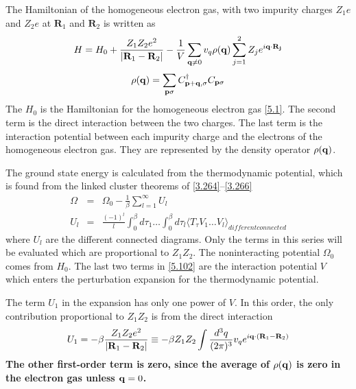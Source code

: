 The Hamiltonian of the homogeneous electron gas, with two impurity charges $Z_1 e$ and $Z_2 e$ at $\mathbf{R}_1$ and $\mathbf{R}_2$ is written as
\begin{equation}
    H= H_0 + \frac{Z_1 Z_2 e^2}{\abs{\mathbf{R}_1 - \mathbf{R}_2}} - \frac{1}{V} \sum_{\mathbf{q}\neq 0} v_q \rho(\mathbf{q}) \sum_{j=1}^2 Z_j e^{i\mathbf{q} \cdot \mathbf{R_j}}      \label{5.102}
\end{equation}
\begin{equation}
    \rho(\mathbf{q}) = \sum_{\mathbf{p}\sigma} C^\dagger_{\mathbf{p}+\mathbf{q},\sigma} C_{\mathbf{p}\sigma}   \label{5.103}
\end{equation}
The $H_0$ is the Hamiltonian for the homogeneous electron gas \eqref{5.1}.
The second term is the direct interaction between the two charges.
The last term is the interaction potential between each impurity charge and the electrons of the homogeneous electron gas.
They are represented by the density operator $\rho(\mathbf{q})$.

The ground state energy is calculated from the thermodynamic potential, which is found from the linked cluster theorems of \eqref{3.264}--\eqref{3.266}
\begin{eqnarray}
    \Omega &=& \Omega_0 - \frac{1}{\beta} \sum_{l=1}^\infty U_l \nonumber \\
    U_l &=& \frac{(-1)^l}{l} \int_0^\beta d\tau_1 \dots \int_0^\beta d \tau_l \langle T_\tau V_1 \dots V_l \rangle_{different connected} \nonumber
\end{eqnarray}
where $U_l$ are the different connected diagrams.
Only the terms in this series will be evaluated which are proportional to $Z_1 Z_2$.
The noninteracting potential $\Omega_0$ comes from $H_0$.
The last two terms in \eqref{5.102} are the interaction potential $V$ which enters the perturbation expansion for the thermodynamic potential.

The term $U_1$ in the expansion has only one power of $V$.
In this order, the only contribution proportional to $Z_1Z_2$ is from the direct interaction
\begin{equation}
    U_1 = - \beta \frac{Z_1 Z_2 e^2}{\abs{\mathbf{R}_1 - \mathbf{R}_2}} \equiv -\beta Z_1 Z_2 \int \frac{d^3 q}{(2\pi)^3} v_q e^{i\mathbf{q}\cdot(\mathbf{R}_1-\mathbf{R}_2)}    \label{5.104}
\end{equation}
\textbf{The other first-order term is zero, since the average of $\rho(\mathbf{q})$ is zero in the electron gas unless $\mathbf{q}=0$.}

